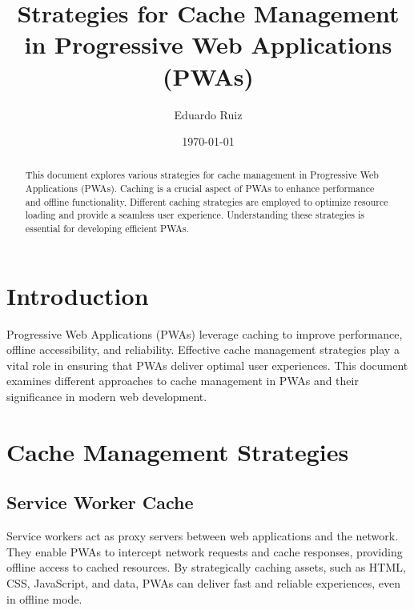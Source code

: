 \documentclass[12pt, a4paper, twoside]{article}
\date{}
\begin{document}

\title{Strategies for Cache Management in Progressive Web Applications (PWAs)}
\author{Eduardo Ruiz}
\date{\today}

\maketitle

\begin{abstract}
This document explores various strategies for cache management in Progressive Web Applications (PWAs). Caching is a crucial aspect of PWAs to enhance performance and offline functionality. Different caching strategies are employed to optimize resource loading and provide a seamless user experience. Understanding these strategies is essential for developing efficient PWAs.
\end{abstract}

\newpage

\tableofcontents

\newpage

\section{Introduction}
Progressive Web Applications (PWAs) leverage caching to improve performance, offline accessibility, and reliability. Effective cache management strategies play a vital role in ensuring that PWAs deliver optimal user experiences. This document examines different approaches to cache management in PWAs and their significance in modern web development.

\section{Cache Management Strategies}
\subsection{Service Worker Cache}
Service workers act as proxy servers between web applications and the network. They enable PWAs to intercept network requests and cache responses, providing offline access to cached resources. By strategically caching assets, such as HTML, CSS, JavaScript, and data, PWAs can deliver fast and reliable experiences, even in offline mode.
\end{document}
